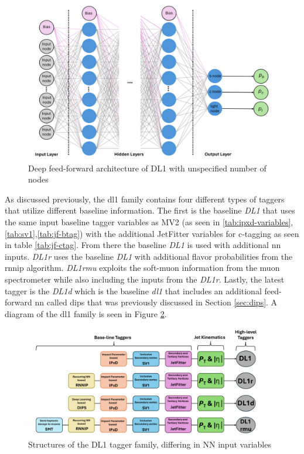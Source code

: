 \begin{figure}[h]
    \centering
    \includegraphics[scale=0.5]{figs/ch5/DL1-arch.png}
    \caption{ Deep feed-forward architecture of DL1 with unspecified number of nodes}
\label{fig:dl1-arch}
\end{figure}
%
As discussed previously, the \gls{dl1} family contains four different types of taggers that utilize different baseline information. The first is the baseline \textit{DL1} that 
uses the same input baseline tagger variables as MV2 (as seen in \ref{tab:ipxd-variables}, \ref{tab:sv1},\ref{tab:jf-btag}) with the additional JetFitter variables for c-tagging 
as seen in table \ref{tab:jf-ctag}. From there the baseline \textit{DL1} is used with additional \gls{nn} inputs. \textit{DL1r} uses the baseline \textit{DL1} with additional 
flavor probabilities from the \gls{rnnip} algorithm. \textit{DL1rmu} exploits the soft-muon information from the muon spectrometer while also including the inputs from the 
\textit{DL1r}. Lastly, the latest tagger is the \textit{DL1d} which is the baseline \textit{dl1} that includes an additional feed-forward \gls{nn} called \gls{dips} that was 
previously discussed in Section \ref{sec:dips}. A diagram of the \gls{dl1} family is seen in Figure \ref{fig:dl1-fam}.

\begin{figure}[h]
    \centering
    \includegraphics[scale=0.5]{figs/ch5/dl1_fam.png}
    \caption{ Structures of the DL1 tagger family, differing in NN input variables }
\label{fig:dl1-fam}
\end{figure}

